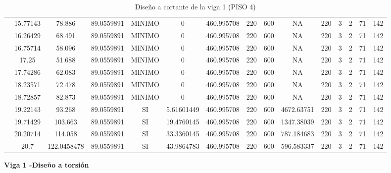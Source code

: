 \begin{table}[H]
{\begin{tabular}{|c|c|c|c|c|c|c|c|c|c|c|c|c|c|c|}
\cline{2-15}    & 15.77143 & 78.886 & 89.0559891 & MINIMO & 0   & 460.995708 & 220 & 600 & NA  & 220 & 3   & 2   & 71  & 142 \bigstrut\\
\cline{2-15}    & 16.26429 & 68.491 & 89.0559891 & MINIMO & 0   & 460.995708 & 220 & 600 & NA  & 220 & 3   & 2   & 71  & 142 \bigstrut\\
\cline{2-15}    & 16.75714 & 58.096 & 89.0559891 & MINIMO & 0   & 460.995708 & 220 & 600 & NA  & 220 & 3   & 2   & 71  & 142 \bigstrut\\
\cline{2-15}    & 17.25 & 51.688 & 89.0559891 & MINIMO & 0   & 460.995708 & 220 & 600 & NA  & 220 & 3   & 2   & 71  & 142 \bigstrut\\
\cline{2-15}    & 17.74286 & 62.083 & 89.0559891 & MINIMO & 0   & 460.995708 & 220 & 600 & NA  & 220 & 3   & 2   & 71  & 142 \bigstrut\\
\cline{2-15}    & 18.23571 & 72.478 & 89.0559891 & MINIMO & 0   & 460.995708 & 220 & 600 & NA  & 220 & 3   & 2   & 71  & 142 \bigstrut\\
\cline{2-15}    & 18.72857 & 82.873 & 89.0559891 & MINIMO & 0   & 460.995708 & 220 & 600 & NA  & 220 & 3   & 2   & 71  & 142 \bigstrut\\
\cline{2-15}    & 19.22143 & 93.268 & 89.0559891 & SI  & 5.61601449 & 460.995708 & 220 & 600 & 4672.63751 & 220 & 3   & 2   & 71  & 142 \bigstrut\\
\cline{2-15}    & 19.71429 & 103.663 & 89.0559891 & SI  & 19.4760145 & 460.995708 & 220 & 600 & 1347.38039 & 220 & 3   & 2   & 71  & 142 \bigstrut\\
\cline{2-15}    & 20.20714 & 114.058 & 89.0559891 & SI  & 33.3360145 & 460.995708 & 220 & 600 & 787.184683 & 220 & 3   & 2   & 71  & 142 \bigstrut\\
\cline{2-15}    & 20.7 & 122.0458478 & 89.0559891 & SI  & 43.9864783 & 460.995708 & 220 & 600 & 596.583337 & 220 & 3   & 2   & 71  & 142 \bigstrut\\
\hline
\end{tabular}%

  
 
  }%
    \caption{Diseño a cortante de la viga 1 (PISO 4) }
  \label{tab:C VG1 P4 }%
\end{table}%
\newpage
\textbf{Viga 1 -Diseño a torsión}

